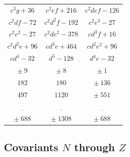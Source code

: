 \documentclass[11pt,a4paper]{book}
\begin{document}
\begin{center}
\begin{tabular}{|c|c|c|}
$c^{3}g+36$ & $c^{2}ef+216$ & $c^{2}def-126$ \\
$c^{2}df-72$ & $c^{2}d^{2}f-192$ & $c^{2}e^{3}-27$ \\
$c^{2}e^{2}-27$ & $c^{2}de^{2}-378$ & $cd^{3}f+16$ \\
$c^{2}d^{2}e+96$ & $cd^{3}e+464$ & $cd^{2}e^{2}+96$ \\
$cd^{4}-32$ & $d^{5}-128$ & $d^{4}e-32$ \\
\hline
$\pm\ 9$ & $\pm\ 8$ & $\pm\ 1$ \\
$182$ & $180$ & $\pm\ 136$ \\
$497$ & $1120$ & $\pm\ 551$ \\
$\underline{\quad\quad}$ & $\underline{\quad\quad}$ & $\underline{\quad\quad}$ \\
$\pm\ 688$ & $\pm\ 1308$ & $\pm\ 688$ \\
\hline
\end{tabular}
\end{center}

\newpage

\subsection*{Covariants $N$ through $Z$}
\end{document}
